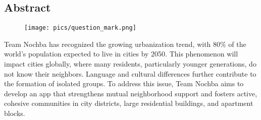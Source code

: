 \begin{spacing}{1}
    \chapter*{Abstract}
\end{spacing}
\begin{wrapfigure}{r}{0.3\textwidth}
    \begin{center}
      \texttt{[image: pics/question\_mark.png]}
    \end{center}
\end{wrapfigure}
Team Nochba has recognized the growing urbanization trend, with 80\% of the world's population expected to live in cities by 2050. This phenomenon will impact cities globally, where many residents, particularly younger generations, do not know their neighbors. Language and cultural differences further contribute to the formation of isolated groups. To address this issue, Team Nochba aims to develop an app that strengthens mutual neighborhood support and fosters active, cohesive communities in city districts, large residential buildings, and apartment blocks.

